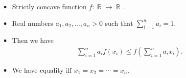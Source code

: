 \documentclass{beamer}
\DeclareMathOperator{\N}{\mathbb{N}}
\DeclareMathOperator{\R}{\mathbb{R}}
\begin{document}
\begin{frame}
  \begin{theorem}
    \begin{itemize}
      \item Strictly concave function \(f\colon \R\to \R\).
      \item Real numbers \(a_1, a_2,\ldots, a_n > 0\) such that \(\sum_{i=1}^n 
          a_i = 1\).
      \item Then we have
        \begin{align*}
          \sum_{i=1}^n a_i f(x_i) \leq f\left( \sum_{i=1}^n a_i x_i\right).
        \end{align*}
      \item We have equality iff \(x_1 = x_2 = \cdots = x_n\).
    \end{itemize}
  \end{theorem}
\end{frame}

%
%
%
\end{document}
